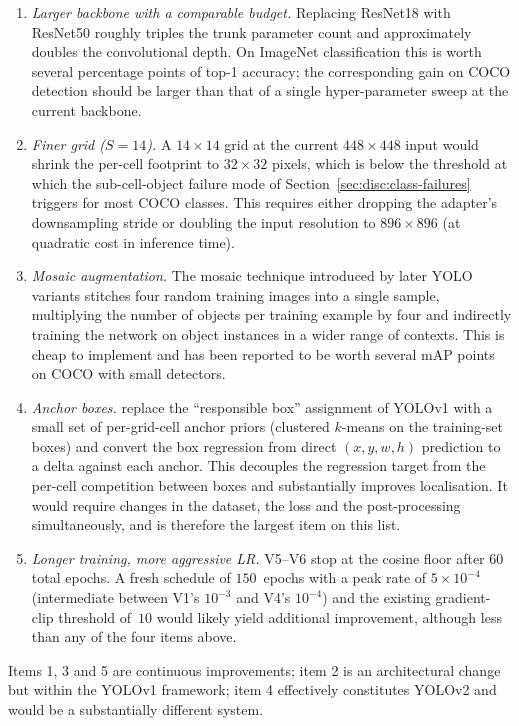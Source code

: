 \begin{enumerate}
    \item \emph{Larger backbone with a comparable budget.} Replacing
        ResNet18 with ResNet50 roughly triples the trunk parameter count and
        approximately doubles the convolutional depth. On ImageNet
        classification this is worth several percentage points of top-1
        accuracy; the corresponding gain on COCO detection should be larger
        than that of a single hyper-parameter sweep at the current backbone.
    \item \emph{Finer grid ($S = 14$).} A $14\!\times\!14$ grid at the
        current $448\!\times\!448$ input would shrink the per-cell footprint
        to $32\!\times\!32$ pixels, which is below the threshold at which the
        sub-cell-object failure mode of Section~\ref{sec:disc:class-failures}
        triggers for most COCO classes. This requires either dropping the
        adapter's downsampling stride or doubling the input resolution to
        $896\!\times\!896$ (at quadratic cost in inference time).
    \item \emph{Mosaic augmentation.} The mosaic technique introduced by
        later YOLO variants stitches four random training images into a
        single sample, multiplying the number of objects per training
        example by four and indirectly training the network on object
        instances in a wider range of contexts. This is cheap to implement
        and has been reported to be worth several mAP points on COCO with
        small detectors.
    \item \emph{Anchor boxes.} \citet{redmon2018yolov3} replace the
        ``responsible box'' assignment of YOLOv1 with a small set of
        per-grid-cell anchor priors (clustered $k$-means on the training-set
        boxes) and convert the box regression from direct $(x, y, w, h)$
        prediction to a delta against each anchor. This decouples the
        regression target from the per-cell competition between boxes and
        substantially improves localisation. It would require changes in the
        dataset, the loss and the post-processing simultaneously, and is
        therefore the largest item on this list.
    \item \emph{Longer training, more aggressive LR.} V5--V6 stop at the
        cosine floor after $60$ total epochs. A fresh schedule of
        $150$~epochs with a peak rate of $5\!\times\!10^{-4}$ (intermediate
        between V1's $10^{-3}$ and V4's $10^{-4}$) and the existing
        gradient-clip threshold of~$10$ would likely yield additional
        improvement, although less than any of the four items above.
\end{enumerate}

\noindent Items 1, 3 and 5 are continuous improvements; item 2 is an
architectural change but within the YOLOv1 framework; item 4 effectively
constitutes YOLOv2 and would be a substantially different system.
